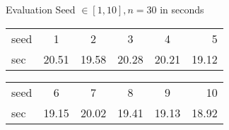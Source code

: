 \documentclass{ocbeameruni}
\begin{document}
\begin{frame}{Evaluation Seed $\in [1,10], n=30$ in seconds}
\begin{center}
\begin{tabular}{ l | c | c |c | c |r }
   seed & 1 & 2 & 3 & 4 & 5  \\
   sec & 20.51 & 19.58 & 20.28 & 20.21 & 19.12 \\
\end{tabular}
\end{center}
\begin{center}
\begin{tabular}{ l | c | c |c | c |r }
   seed & 6 & 7 & 8 & 9 & 10  \\
   sec & 19.15 & 20.02 & 19.41 & 19.13 & 18.92 \\
\end{tabular}
\end{center}
\end{frame}
\end{document}
